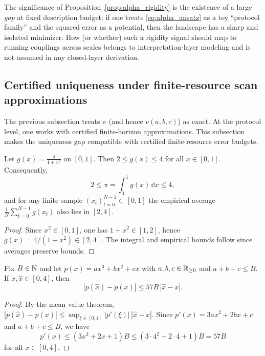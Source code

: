 \begin{remark}
The significance of Proposition~\ref{prop:alpha_rigidity} is the existence of a large \emph{gap} at fixed description budget: if one treats \eqref{eq:alpha_ansatz} as a toy ``protocol family'' and the squared error as a potential, then the landscape has a sharp and isolated minimizer.
How (or whether) such a rigidity signal should map to running couplings across scales belongs to interpretation-layer modeling and is not assumed in any closed-layer derivation.
\end{remark}

\subsection{Certified uniqueness under finite-resource scan approximations}
\label{sec:certified_uniqueness}

The previous subsection treats $\pi$ (and hence $v(a,b,c)$) as exact.
At the protocol level, one works with certified finite-horizon approximations.
This subsection makes the uniqueness gap compatible with certified finite-resource error budgets.

\begin{lemma}
\label{lem:pi_kernel_range}
Let $g(x)=\frac{4}{1+x^2}$ on $[0,1]$.
Then $2\le g(x)\le 4$ for all $x\in[0,1]$.
Consequently,
\[
2\le \pi=\int_0^1 g(x)\,\dd x\le 4,
\]
and for any finite sample $(x_t)_{t=0}^{N-1}\subset[0,1]$ the empirical average $\frac{1}{N}\sum_{t=0}^{N-1} g(x_t)$ also lies in $[2,4]$.
\end{lemma}

\begin{proof}
Since $x^2\in[0,1]$, one has $1+x^2\in[1,2]$, hence $g(x)=4/(1+x^2)\in[2,4]$.
The integral and empirical bounds follow since averages preserve bounds.
\end{proof}

\begin{lemma}
\label{lem:poly_perturb}
Fix $B\in\mathbb{N}$ and let $p(x)=ax^3+bx^2+cx$ with $a,b,c\in\mathbb{R}_{\ge 0}$ and $a+b+c\le B$.
If $x,\widehat x\in[0,4]$, then
\[
|p(\widehat x)-p(x)|
\le 57B\,|\widehat x-x|.
\]
\end{lemma}

\begin{proof}
By the mean value theorem, $|p(\widehat x)-p(x)|\le \sup_{\xi\in[0,4]}|p'(\xi)|\,|\widehat x-x|$.
Since $p'(x)=3ax^2+2bx+c$ and $a+b+c\le B$, we have
\[
p'(x)\le (3x^2+2x+1)B\le (3\cdot 4^2+2\cdot 4+1)B=57B
\]
for all $x\in[0,4]$.
\end{proof}

